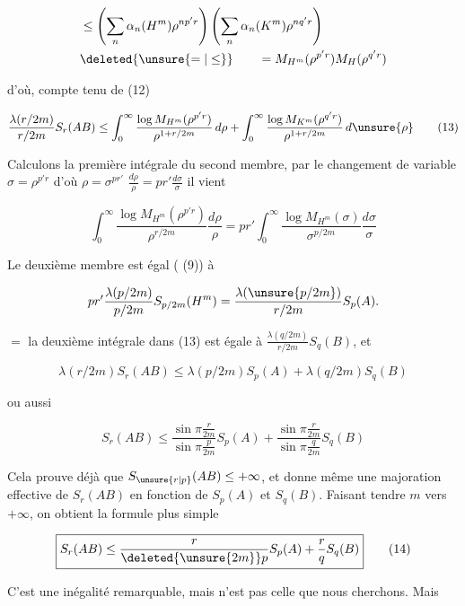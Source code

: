 \[
\begin{aligned}
&\leq\left(\sum_n\alpha_n(H^m)\rho^{np'r}\right)
\left(\sum_n\alpha_n(K^m)\rho^{nq'r}\right)\\
&\deleted{\unsure{=|\leq}}\qquad=M_{H^m}(\rho^{p'r})M_H(\rho^{q'r})
\end{aligned}
\]

d'où, compte tenu de (12)

\[
\frac{\lambda(r/2m)}{r/2m}S_r(AB)\leq
\int_0^\infty\frac{\log M_{H^m}(\rho^{p'r})}{\rho^{1+r/2m}}\,d\rho+
\int_0^\infty\frac{\log M_{K^m}(\rho^{q'r})}{\rho^{1+r/2m}}\,d\unsure{\rho}
\tag*{(13)}
\]

Calculons  la première intégrale du second membre, par le changement de variable $\sigma=\rho^{p'r}$ d'où $\rho=\sigma^{pr'}$ $\frac{d\rho}{\rho}=pr'\frac{d\sigma}{\sigma}$ il vient

\[
\int_0^\infty\frac{\log M_{H^m}(\rho^{p'r})}{\rho^{r/2m}}\frac{d\rho}{\rho}
=pr'\int_0^\infty\frac{\log M_{H^m}(\sigma)}{\sigma^{p/2m}}\frac{d\sigma}{\sigma}
\]

Le deuxième membre est égal ( (9)) à

\[
pr'\frac{\lambda(p/2m)}{p/2m}S_{p/2m}(H^m)=\frac{\lambda(\unsure{p/2m})}{r/2m}S_p(A).
\]

 $=$ la deuxième intégrale dans (13) est égale à $\frac{\lambda(q/2m)}{r/2m}S_q(B)$, et  

\[
\lambda(r/2m)S_r(AB)\leq\lambda(p/2m)S_p(A)+\lambda(q/2m)S_q(B)
\]

ou aussi

\[
S_r(AB)\leq\frac{\sin\pi\frac{r}{2m}}{\sin\pi\frac{p}{2m}}S_p(A)+
\frac{\sin\pi\frac{r}{2m}}{\sin\pi\frac{q}{2m}}S_q(B)
\]

Cela prouve déjà que $S_{\unsure{r|p}}(AB)\leq+\infty$, et donne même une majoration effective de $S_r(AB)$ en fonction de $S_p(A)$ et $S_q(B)$. Faisant tendre $m$ vers $+\infty$, on obtient la formule plus simple

\[
\boxed{S_r(AB)\leq\frac{r}{\deleted{\unsure{2m}}p}S_p(A)+\frac rq S_q(B)}\tag*{(14)}
\]

C'est une inégalité remarquable, mais n'est pas celle que nous cherchons. Mais 
